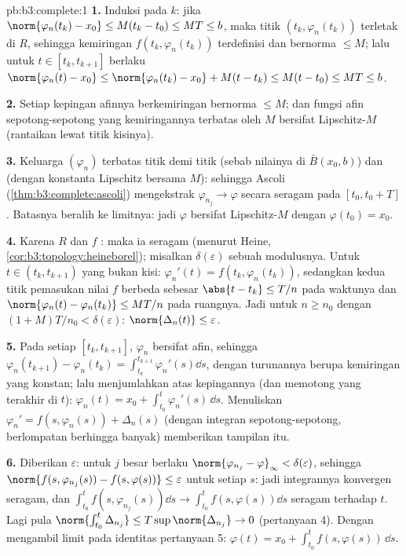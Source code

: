 \begin{solution}{pb:b3:complete:1}
\textbf{1.} Induksi pada $k$: jika $\norm{\varphi_n(t_k) - x_0}
\leq M(t_k - t_0) \leq MT \leq b$, maka titik $(t_k,
\varphi_n(t_k))$ terletak di $R$, sehingga kemiringan $f(t_k,
\varphi_n(t_k))$ terdefinisi dan bernorma $\leq M$; lalu untuk $t \in
[t_k, t_{k+1}]$ berlaku $\norm{\varphi_n(t) - x_0} \leq
\norm{\varphi_n(t_k) - x_0} + M(t - t_k) \leq M(t - t_0) \leq
MT \leq b$.

\textbf{2.} Setiap kepingan afinnya berkemiringan bernorma $\leq M$; dan
fungsi afin sepotong-sepotong yang kemiringannya terbatas oleh $M$ bersifat
Lipschitz-$M$ (rantaikan lewat titik kisinya).

\textbf{3.} Keluarga $(\varphi_n)$ terbatas titik demi titik
(sebab nilainya di $\bar B(x_0, b)$) dan  (dengan konstanta
Lipschitz bersama $M$): sehingga Ascoli
(\cref{thm:b3:complete:ascoli}) mengekstrak $\varphi_{n_j} \to
\varphi$ secara seragam pada $[t_0, t_0 + T]$. Batasnya beralih ke
limitnya: jadi $\varphi$ bersifat Lipschitz-$M$ dengan $\varphi(t_0) = x_0$.

\textbf{4.} Karena $R$  dan $f$ : maka ia 
seragam (menurut Heine, \cref{cor:b3:topology:heineborel}); misalkan
$\delta(\varepsilon)$ sebuah modulusnya. Untuk $t \in (t_k,
t_{k+1})$ yang bukan kisi: $\varphi_n'(t) = f(t_k, \varphi_n(t_k))$, sedangkan
kedua titik pemasukan nilai $f$ berbeda sebesar $\abs{t - t_k} \leq T/n$
pada waktunya dan $\norm{\varphi_n(t) - \varphi_n(t_k)} \leq MT/n$ pada
ruangnya. Jadi untuk $n \geq n_0$ dengan $(1 + M)T/n_0 < \delta(\varepsilon)$:
$\norm{\Delta_n(t)} \leq \varepsilon$.

\textbf{5.} Pada setiap $[t_k, t_{k+1}]$, $\varphi_n$ bersifat afin, sehingga
$\varphi_n(t_{k+1}) - \varphi_n(t_k) = \int_{t_k}^{t_{k+1}}
\varphi_n'(s)\dd s$, dengan turunannya berupa kemiringan yang konstan;
lalu menjumlahkan atas kepingannya (dan memotong yang terakhir di $t$):
$\varphi_n(t) = x_0 + \int_{t_0}^t\varphi_n'(s)\,\dd s$.
Menuliskan $\varphi_n' = f(s, \varphi_n(s)) + \Delta_n(s)$
(dengan integran  sepotong-sepotong, berlompatan berhingga banyak) memberikan
tampilan itu.

\textbf{6.} Diberikan $\varepsilon$: untuk $j$ besar berlaku
$\norm{\varphi_{n_j} - \varphi}_\infty < \delta(\varepsilon)$,
sehingga $\norm{f(s, \varphi_{n_j}(s)) - f(s, \varphi(s))} \leq
\varepsilon$ untuk setiap $s$: jadi integrannya konvergen
seragam, dan $\int_{t_0}^t f(s,\varphi_{n_j}(s))\dd s \to
\int_{t_0}^tf(s, \varphi(s))\dd s$ seragam terhadap $t$. Lagi pula
$\norm{\int_{t_0}^t\Delta_{n_j}} \leq T\sup\norm{\Delta_{n_j}}
\to 0$ (pertanyaan 4). Dengan mengambil limit pada identitas
pertanyaan 5: $\varphi(t) = x_0 + \int_{t_0}^tf(s,
\varphi(s))\,\dd s$.


\end{solution}
